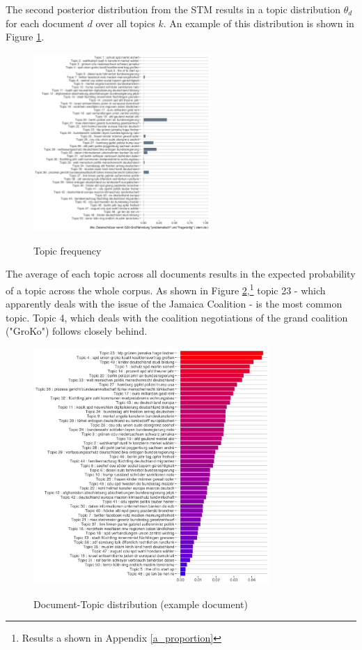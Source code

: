 \documentclass[12pt,a4paper,notitlepage]{article}
\begin{document}
The second posterior distribution from the STM results in a topic distribution $\theta_d$ for each document $d$ over all topics $k$.  An example of this distribution is shown in Figure \ref{fig_doc_topic_distr}.

\begin{figure}[H]
\begin{center}
	\caption{Topic frequency}
	\includegraphics[width=0.6\textwidth]{../figs/doc_topic_distr}
	\label{fig_doc_topic_distr}
	\end{center}
\end{figure}

The average of each topic across all documents results in the expected probability of a topic across the whole corpus. As shown in Figure \ref{fig_expected_freq},\footnote{Results a shown in Appendix \ref{a_proportion}} topic 23 - which apparently deals with the issue of the Jamaica Coalition - is the most common topic. Topic 4, which deals with the coalition negotiations of the grand coalition ("GroKo") follows closely behind. 

\begin{figure}[H]
\begin{center}
	\caption{Document-Topic distribution (example document) }
	\includegraphics[width=0.8\textwidth]{../figs/topic_proportion}
	\label{fig_expected_freq}
	\end{center}
\end{figure}
\end{document}
